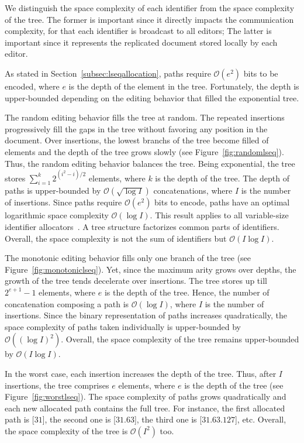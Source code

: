 We distinguish the space complexity of each identifier from the space complexity
of the tree. The former is important since it directly impacts the communication
complexity, for that each identifier is broadcast to all editors; The latter is
important since it represents the replicated document stored locally by each
editor.

As stated in Section~\ref{subsec:lseqallocation}, paths
require $\mathcal{O}(e^2)$ bits to be encoded,
where $e$ is the depth of the element in the tree. Fortunately, the depth is
upper-bounded depending on the editing behavior that filled the exponential
tree.

The random editing behavior fills the tree at random. The repeated insertions
progressively fill the gaps in the tree without favoring any position in the
document. Over insertions, the lowest branchs of the tree become filled of
elements and the depth of the tree grows slowly (see
Figure~\ref{fig:randomlseq}). Thus, the random editing behavior balances the
tree. Being exponential, the tree stores
$\textstyle\sum\nolimits_{i=1}^{k}{2^{(i^2-i)/2}}$ elements, where $k$ is the
depth of the tree. The depth of paths is upper-bounded by
$\mathcal{O}(\sqrt{\log I})$ concatenations, where $I$ is the number of
insertions. Since paths require $\mathcal{O}(e^2)$ bits to encode, paths have an
optimal logarithmic space complexity $\mathcal{O}(\log I)$. This result applies
to all variable-size identifier allocators~\cite{preguica2009commutative,
  weiss2009logoot}. A tree structure factorizes common parts of
identifiers. Overall, the space complexity is not the sum of identifiers but
$\mathcal{O}(I\log I)$.

The monotonic editing behavior fills only one branch of the tree (see
Figure~\ref{fig:monotoniclseq}). Yet, since the maximum arity grows over depths, the
growth of the tree tends decelerate over insertions. The tree stores up till
$2^{e+1}-1$ elements, where $e$ is the depth of the tree. Hence, the number of
concatenation composing a path is $\mathcal{O}(\log I)$, where $I$ is the number
of insertions. Since the binary representation of paths increases quadratically,
the space complexity of paths taken individually is upper-bounded by
$\mathcal{O}((\log I)^2)$.  Overall, the space complexity of the tree remains
upper-bounded by $\mathcal{O}(I\log I)$.

In the worst case, each insertion increases the depth of the tree. Thus, after
$I$ insertions, the tree comprises $e$ elements, where $e$ is the depth of the
tree (see Figure~\ref{fig:worstlseq}). The space complexity of paths grows
quadratically and each new allocated path contains the full tree. For instance,
the first allocated path is [$31$], the second one is [$31.63$], the third one
is [$31.63.127$], etc.  Overall, the space complexity of the tree is
$\mathcal{O}(I^2)$ too.

